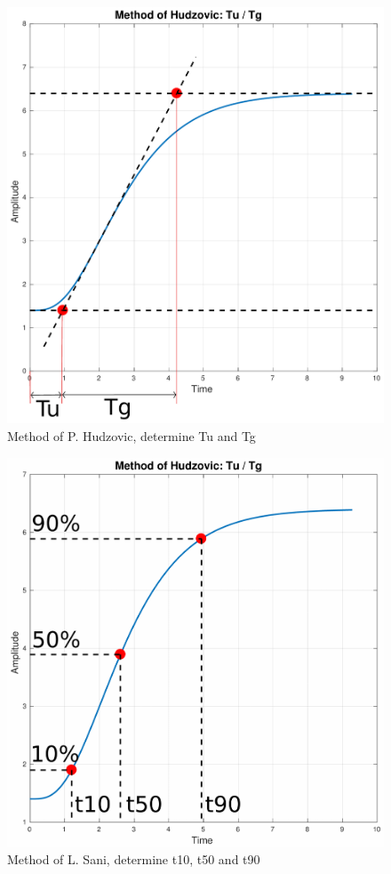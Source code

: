 \begin{figure}
    \includegraphics[width=\linewidth]{images/step_response_tu_tg}
    \caption{Method of P. Hudzovic, determine Tu and Tg}
    \label{fig:tu_tg}
\end{figure}
\begin{figure}
    \includegraphics[width=\linewidth]{images/step_response_t10_t50_t90}
    \caption{Method of L. Sani, determine t10, t50 and t90}
    \label{fig:t10_t50_t90}
\end{figure}

